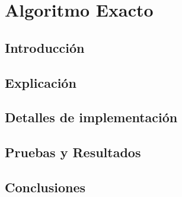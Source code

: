 \section {Algoritmo Exacto}
\subsection{Introducción}


\subsection{Explicación}


\subsection{Detalles de implementación}


\subsection{Pruebas y Resultados}


\subsection{Conclusiones}

